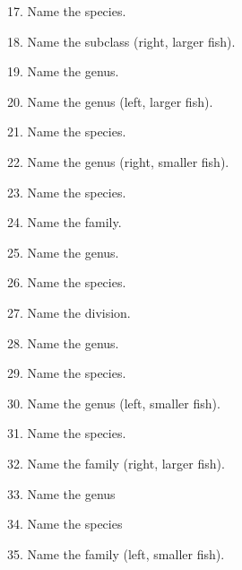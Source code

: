 \documentclass{article}
\begin{document}
{17. Name the species.
\vspace{0.5\baselineskip}

18. Name the subclass (right, larger fish).
\vspace{0.5\baselineskip}

19. Name the genus.
\vspace{2\baselineskip}


20. Name the genus (left, larger fish).
\vspace{0.5\baselineskip}

21. Name the species.
\vspace{0.5\baselineskip}

22. Name the genus (right, smaller fish).
\vspace{0.5\baselineskip}

23. Name the species.
\vspace{2\baselineskip}


24. Name the family.
\vspace{0.5\baselineskip}

25. Name the genus.
\vspace{0.5\baselineskip}

26. Name the species.
\vspace{2\baselineskip}


27. Name the division.
\vspace{0.5\baselineskip}

28. Name the genus.
\vspace{0.5\baselineskip}

29. Name the species.
\vspace{2\baselineskip}


30. Name the genus (left, smaller fish).
\vspace{0.5\baselineskip}

31. Name the species.
\vspace{0.5\baselineskip}

32. Name the family (right, larger fish).
\vspace{0.5\baselineskip}

33. Name the genus
\vspace{0.5\baselineskip}

34. Name the species
\vspace{2\baselineskip}
%
\newpage

35. Name the family (left, smaller fish).
\vspace{0.5\baselineskip}

}
\end{document}
